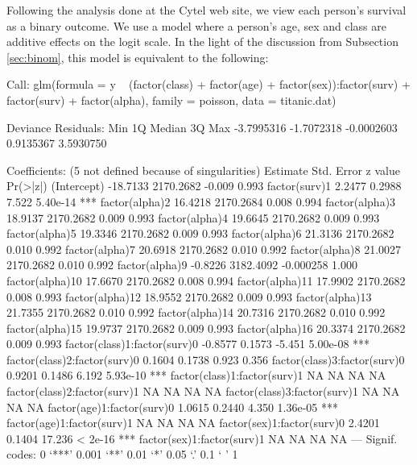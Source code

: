 \documentclass[a4paper]{article}
\begin{document}
Following the analysis done at the Cytel web site, we view each
person's survival as a binary outcome. We use a model where a person's
age, sex and class are additive effects on the logit scale. In the
light of the discussion from Subsection \ref{sec:binom}, this model is
equivalent to the following:
\begin{Schunk}
\begin{Soutput}
Call:
glm(formula = y ~ (factor(class) + factor(age) + factor(sex)):factor(surv) + 
    factor(surv) + factor(alpha), family = poisson, data = titanic.dat)

Deviance Residuals: 
       Min          1Q      Median          3Q         Max  
-3.7995316  -1.7072318  -0.0002603   0.9135367   3.5930750  

Coefficients: (5 not defined because of singularities)
                              Estimate Std. Error   z value Pr(>|z|)    
(Intercept)                   -18.7133  2170.2682    -0.009    0.993    
factor(surv)1                   2.2477     0.2988     7.522 5.40e-14 ***
factor(alpha)2                 16.4218  2170.2684     0.008    0.994    
factor(alpha)3                 18.9137  2170.2682     0.009    0.993    
factor(alpha)4                 19.6645  2170.2682     0.009    0.993    
factor(alpha)5                 19.3346  2170.2682     0.009    0.993    
factor(alpha)6                 21.3136  2170.2682     0.010    0.992    
factor(alpha)7                 20.6918  2170.2682     0.010    0.992    
factor(alpha)8                 21.0027  2170.2682     0.010    0.992    
factor(alpha)9                 -0.8226  3182.4092 -0.000258    1.000    
factor(alpha)10                17.6670  2170.2682     0.008    0.994    
factor(alpha)11                17.9902  2170.2682     0.008    0.993    
factor(alpha)12                18.9552  2170.2682     0.009    0.993    
factor(alpha)13                21.7355  2170.2682     0.010    0.992    
factor(alpha)14                20.7316  2170.2682     0.010    0.992    
factor(alpha)15                19.9737  2170.2682     0.009    0.993    
factor(alpha)16                20.3374  2170.2682     0.009    0.993    
factor(class)1:factor(surv)0   -0.8577     0.1573    -5.451 5.00e-08 ***
factor(class)2:factor(surv)0    0.1604     0.1738     0.923    0.356    
factor(class)3:factor(surv)0    0.9201     0.1486     6.192 5.93e-10 ***
factor(class)1:factor(surv)1        NA         NA        NA       NA    
factor(class)2:factor(surv)1        NA         NA        NA       NA    
factor(class)3:factor(surv)1        NA         NA        NA       NA    
factor(age)1:factor(surv)0      1.0615     0.2440     4.350 1.36e-05 ***
factor(age)1:factor(surv)1          NA         NA        NA       NA    
factor(sex)1:factor(surv)0      2.4201     0.1404    17.236  < 2e-16 ***
factor(sex)1:factor(surv)1          NA         NA        NA       NA    
---
Signif. codes:  0 `***' 0.001 `**' 0.01 `*' 0.05 `.' 0.1 ` ' 1 


\end{Soutput}
\end{Schunk}
\end{document}
